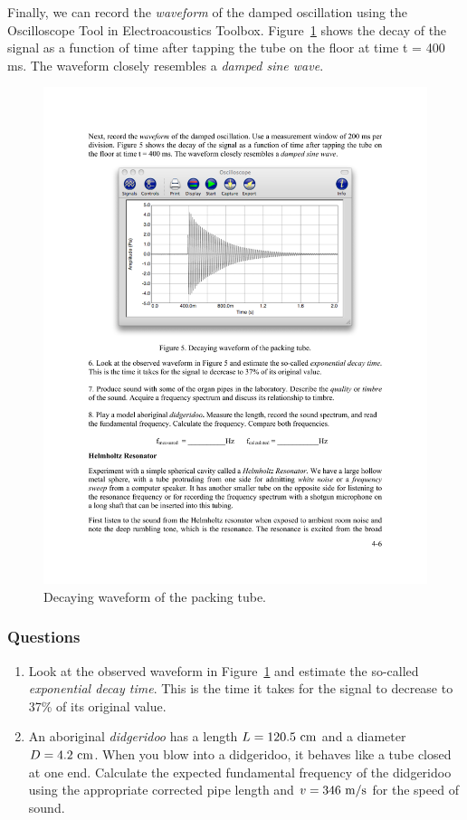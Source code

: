 \documentclass[11pt]{NSF}
\def\ben{\begin{enumerate}}
\def\een{\end{enumerate}}
\def\i{\item{}}
\begin{document}
Finally, we can record the {\em waveform} of the damped oscillation using 
the Oscilloscope Tool in Electroacoustics Toolbox.
Figure~\ref{f:5} shows the decay of the signal as a function of
time after tapping the tube on the floor at time t = 400 ms. The waveform
closely resembles a {\em damped sine wave}.
%
\begin{figure}[hbtp]
\begin{center}
\includegraphics[width=.7\textwidth]{fig4_5}
\caption{Decaying waveform of the packing tube.}
\label{f:5} 
\end{center} 
\end{figure}
%

\subsubsection*{Questions}
\ben
\i Look at the observed waveform in Figure~\ref{f:5} and 
estimate the so-called {\em exponential decay time}. 
This is the time it takes for the signal to decrease to
37\% of its original value.

\i An aboriginal {\em didgeridoo} has a length $L=120.5~{\rm cm}$
and a diameter $D=4.2~{\rm cm}$.
When you blow into a didgeridoo, it behaves like a tube closed at one end.
Calculate the expected fundamental frequency of the didgeridoo
using the appropriate corrected pipe length and $v=346~{\rm m/s}$
for the speed of sound.

\een
\end{document}
